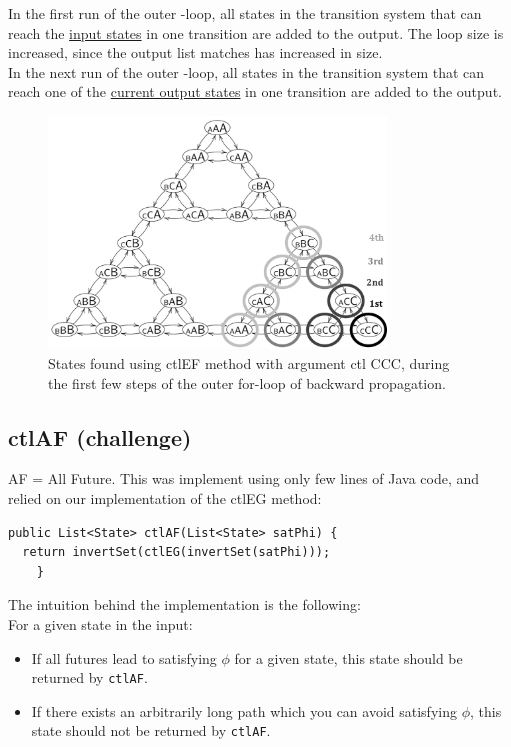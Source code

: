 In the first run of the outer -loop, all states in the transition system that can reach the \underline{input states} in one transition are added to the output. The loop size is increased, since the output list matches has increased in size.\\

In the next run of the outer -loop, all states in the transition system that can reach one of the \underline{current output states} in one transition are added to the output.

\begin{figure}[H]
    \centering
    \includegraphics[width=0.8\textwidth]{fig/backprop.pdf}
    \caption{States found using ctlEF method with argument ctl CCC, during the first few steps of the outer for-loop of backward propagation.}
    \label{fig:backprop}
\end{figure}

\subsection{ctlAF (challenge)}
AF = All Future. This was implement using only few lines of Java code, and relied on our implementation of the ctlEG method:

\begin{lstlisting}
public List<State> ctlAF(List<State> satPhi) {
  return invertSet(ctlEG(invertSet(satPhi)));
	}
\end{lstlisting}

The intuition behind the implementation is the following:\\

For a given state in the input:
\begin{itemize}
    \item If all futures lead to satisfying $\phi$ for a given state, this state should be returned by \texttt{ctlAF}.
    
    \item If there exists an arbitrarily long path which you can avoid satisfying $\phi$, this state should not be returned by \texttt{ctlAF}.
\end{itemize}

